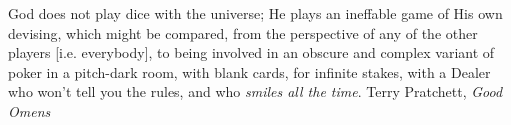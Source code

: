 
\begin{declaration}
  
\end{declaration}

\begin{abstract}
  
\end{abstract}

\begin{acknowledgements}
  
\end{acknowledgements}

%  

\tableofcontents

\listoffigures
\listoftables

\frontquote%
{God does not play dice with the universe; He plays an ineffable game of His own
devising, which might be compared, from the perspective of any of the other
players [i.e. everybody], to being involved in an obscure and complex variant of
poker in a pitch-dark room, with blank cards, for infinite stakes, with a Dealer
who won't tell you the rules, and who \emph{smiles all the time}.}
{Terry Pratchett, \emph{Good Omens}}
